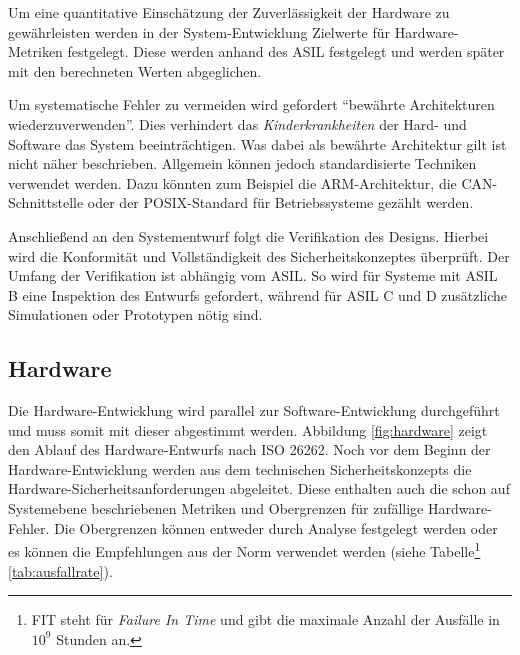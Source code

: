 \documentclass[a4paper,DIV=calc,ngerman]{scrartcl}
\begin{document}
Um eine quantitative Einschätzung der Zuverlässigkeit der Hardware zu gewährleisten werden in der System-Entwicklung Zielwerte für Hardware-Metriken festgelegt. Diese werden anhand des ASIL festgelegt und werden später mit den berechneten Werten abgeglichen.

Um systematische Fehler zu vermeiden wird gefordert "`bewährte Architekturen wiederzuverwenden"'. Dies verhindert das \emph{Kinderkrankheiten} der Hard- und Software das System beeinträchtigen. Was dabei als bewährte Architektur gilt ist nicht näher beschrieben. Allgemein können jedoch standardisierte Techniken verwendet werden. Dazu könnten zum Beispiel die ARM-Architektur, die CAN-Schnittstelle oder der POSIX-Standard für Betriebssysteme gezählt werden.

Anschließend an den Systementwurf folgt die Verifikation des Designs. Hierbei wird die Konformität und Vollständigkeit des Sicherheitskonzeptes überprüft. Der Umfang der Verifikation ist abhängig vom ASIL. So wird für Systeme mit ASIL B eine Inspektion des Entwurfs gefordert, während für ASIL C und D zusätzliche Simulationen oder Prototypen nötig sind.




\subsection{Hardware}
\label{sec:Hardware}

Die Hardware-Entwicklung wird parallel zur Software-Entwicklung durchgeführt und muss somit mit dieser abgestimmt werden. Abbildung \ref{fig:hardware} zeigt den Ablauf des Hardware-Entwurfs nach ISO 26262. Noch vor dem Beginn der Hardware-Entwicklung werden aus dem technischen Sicherheitskonzepts die Hardware-Sicherheitsanforderungen abgeleitet. Diese enthalten auch die schon auf Systemebene beschriebenen Metriken und Obergrenzen für zufällige Hardware-Fehler. Die Obergrenzen können entweder durch Analyse festgelegt werden oder es können die Empfehlungen aus der Norm verwendet werden (siehe Tabelle\footnote{FIT steht für \emph{Failure In Time} und gibt die maximale Anzahl der Ausfälle in $10^9$ Stunden an.} \ref{tab:ausfallrate}). 
\end{document}
